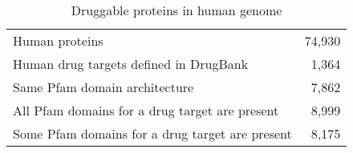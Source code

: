 \begin{table}
	\begin{center}
		\sf
		\begin{tabular}{l r}
			\hline
				Human proteins									&	74,930	\\
				Human drug targets defined in DrugBank			&	1,364	\\
				Same Pfam domain architecture					&	7,862	\\
				All Pfam domains for a drug target are present	&	8,999	\\
				Some Pfam domains for a drug target are present	&	8,175	\\
			\hline
		\end{tabular}
		\caption{Druggable proteins in human genome}
	\end{center}
\end{table}




